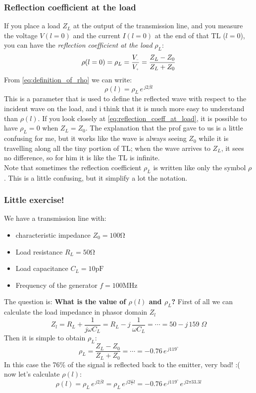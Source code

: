 \subsubsection*{Reflection coefficient at the load}
If you place a load $Z_L$ at the output of the transmission line, and you measure the voltage $V(l=0)$ and the current $I(l=0)$ at the end of that TL ($l=0$), you can have the \emph{reflection coefficient at the load} $\rho_L$:
\begin{equation}\label{eq:reflection_coeff_at_load}
    \rho(l=0)=\rho_L=\frac{V\bottomMinus}{V\bottomPlus}=\frac{Z_L-Z_0}{Z_L+Z_0}
\end{equation}
From \cref{eq:definition_of_rho} we can write:
\begin{equation}\label{eq:reflection_coeff_at_load2}
    \rho(l)=\rho_L\,e^{\,j2\beta l}
\end{equation}
This is a parameter that is used to define the reflected wave with respect to the
incident wave on the load, and i think that it is much more easy to understand than $\rho(l)$.
If you look closely at \cref{eq:reflection_coeff_at_load}, it is possible to have $\rho_L=0$ when $Z_L=Z_0$. The explanation that the prof gave to us is a little confusing for me, but it works like the wave is always seeing $Z_0$ while it is travelling along all the tiny portion of TL; when the wave arrives to $Z_L$, it sees no difference, so for him it is like the TL is infinite.\\
Note that sometimes the reflection coefficient $\rho_L$ is written like only the symbol $\rho$. This is a little confusing, but it simplify a lot the notation.
\subsubsection*{Little exercise!}
We have a transmission line with:
\begin{itemize}
    \item characteristic impedance $Z_0 = 100 \si{\ohm}$
    \item Load resistance $R_L=50 \si{\ohm}$ 
    \item Load capacitance $C_L=10 \si{\pico\farad}$
    \item Frequency of the generator $f=100\si{\mega\hertz}$
\end{itemize}
The question is: \textbf{What is the value of $\rho(l)$ and $\rho_L$?}
First of all we can calculate the load impedance in phasor domain $Z_l$
\begin{equation*}
    Z_l=R_L+\frac{1}{j\omega C_L}=R_L-j\,\frac{1}{\omega C_L}=\cdots =50-j\,159\;\Omega
\end{equation*}
Then it is simple to obtain $\rho_L$:
\begin{equation*}
    \rho_L =\frac{Z_L-Z_0}{Z_L+Z_0}=\cdots =-0.76\,e^{\,j119^{\circ}}
\end{equation*}
In this case the 76\% of the signal is reflected back to the emitter, very bad! :(\\
now let's calculate $\rho(l)$:
\begin{equation*}
    \rho(l)=\rho_L\,e^{\,j2\beta l}=\rho_L\,e^{\,j2\frac{\omega}{c} l}=-0.76\,e^{\,j119^{\circ}}\,e^{\,j 2\pi 33.3 l}
\end{equation*}
